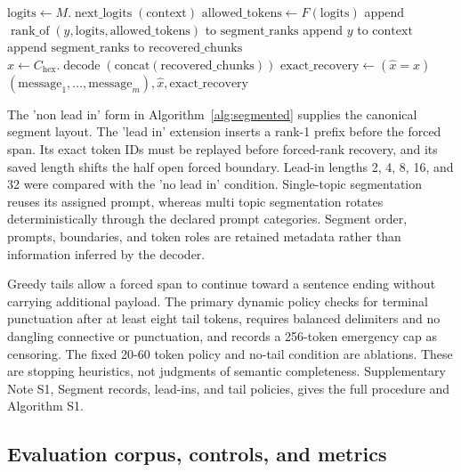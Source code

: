 \documentclass[fleqn,10pt]{wlscirep}
\newcommand{\RankOf}{\operatorname{rank\_of}}
\newcommand{\Decode}{\operatorname{decode}}
\newcommand{\NextLogits}{\operatorname{next\_logits}}
\begin{document}
\begin{algorithm}[H]
\begin{algorithmic}[1]
        \State \(\mathrm{logits} \gets M.\NextLogits(\mathrm{context})\)
        \State \(\mathrm{allowed\_tokens} \gets F(\mathrm{logits})\)
        \State append \(\RankOf(y,\mathrm{logits},\mathrm{allowed\_tokens})\) to \(\mathrm{segment\_ranks}\)
        \State append \(y\) to \(\mathrm{context}\)
    \EndFor
    \State append \(\mathrm{segment\_ranks}\) to \(\mathrm{recovered\_chunks}\)
\EndFor
\State \(\hat{x} \gets C_{\mathrm{hex}}.\Decode(\mathrm{concat}(\mathrm{recovered\_chunks}))\)
\State \(\mathrm{exact\_recovery} \gets (\hat{x}=x)\)
\State \Return \((\mathrm{message}_1,\ldots,\mathrm{message}_m),\hat{x},\mathrm{exact\_recovery}\)
\end{algorithmic}
\end{algorithm}

The 'non lead in' form in Algorithm~\ref{alg:segmented} supplies the canonical segment layout. The 'lead in' extension inserts a rank-1 prefix before the forced span. Its exact token IDs must be replayed before forced-rank recovery, and its saved length shifts the half open forced boundary. Lead-in lengths 2, 4, 8, 16, and 32 were compared with the 'no lead in' condition. Single-topic segmentation reuses its assigned prompt, whereas multi topic segmentation rotates deterministically through the declared prompt categories. Segment order, prompts, boundaries, and token roles are retained metadata rather than information inferred by the decoder.

Greedy tails allow a forced span to continue toward a sentence ending without carrying additional payload. The primary dynamic policy checks for terminal punctuation after at least eight tail tokens, requires balanced delimiters and no dangling connective or punctuation, and records a 256-token emergency cap as censoring. The fixed 20-60 token policy and no-tail condition are ablations. These are stopping heuristics, not judgments of semantic completeness. Supplementary Note S1, Segment records, lead-ins, and tail policies, gives the full procedure and Algorithm S1.

\subsection*{Evaluation corpus, controls, and metrics}\label{sec:design-method}\label{sec:quality-method}
\end{document}
